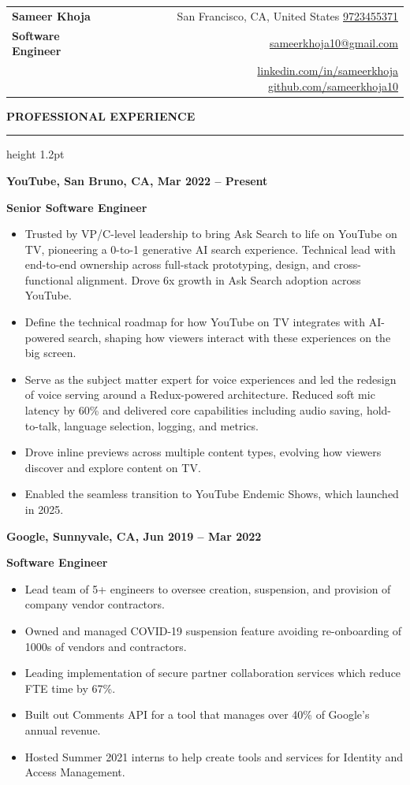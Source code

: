 \documentclass[11pt,a4paper]{article}
\newcommand{\sectionheading}[1]{%
  \vspace{1.25em}
  {\large\bfseries\MakeUppercase{#1}}\par
  \vspace{0.25em}
  \hrule height 1.2pt
  \vspace{0.95em}
}
\newcommand{\experience}[4]{%
  {\bfseries #1, #2, #3}\par
  {\bfseries #4}\par
  \vspace{0.35em}
}
\newenvironment{resumebullets}{%
  \begin{itemize}[
    leftmargin=1.55em,
    itemsep=0.18em,
    topsep=0pt,
    parsep=0pt,
    partopsep=0pt
  ]
}{%
  \end{itemize}
}
\begin{document}
\begin{tabularx}{\textwidth}{Xr}
  {\Huge\bfseries Sameer Khoja} &
  San Francisco, CA, United States \textbullet{}
  \href{tel:9723455371}{9723455371} \\
  {\LARGE\bfseries Software Engineer} &
  \href{mailto:sameerkhoja10@gmail.com}{sameerkhoja10@gmail.com} \\
  &
  \href{https://linkedin.com/in/sameerkhoja}{linkedin.com/in/sameerkhoja} \textbullet{}
  \href{https://github.com/sameerkhoja10}{github.com/sameerkhoja10}
\end{tabularx}

\sectionheading{Professional Experience}

\experience{YouTube}{San Bruno, CA}{Mar 2022 -- Present}{Senior Software Engineer}
\begin{resumebullets}
  \item Trusted by VP/C-level leadership to bring Ask Search to life on YouTube on TV, pioneering a 0-to-1 generative AI search experience. Technical lead with end-to-end ownership across full-stack prototyping, design, and cross-functional alignment. Drove 6x growth in Ask Search adoption across YouTube.
  \item Define the technical roadmap for how YouTube on TV integrates with AI-powered search, shaping how viewers interact with these experiences on the big screen.
  \item Serve as the subject matter expert for voice experiences and led the redesign of voice serving around a Redux-powered architecture. Reduced soft mic latency by 60\% and delivered core capabilities including audio saving, hold-to-talk, language selection, logging, and metrics.
  \item Drove inline previews across multiple content types, evolving how viewers discover and explore content on TV.
  \item Enabled the seamless transition to YouTube Endemic Shows, which launched in 2025.
\end{resumebullets}

\vspace{0.9em}
\experience{Google}{Sunnyvale, CA}{Jun 2019 -- Mar 2022}{Software Engineer}
\begin{resumebullets}
  \item Lead team of 5+ engineers to oversee creation, suspension, and provision of company vendor contractors.
  \item Owned and managed COVID-19 suspension feature avoiding re-onboarding of 1000s of vendors and contractors.
  \item Leading implementation of secure partner collaboration services which reduce FTE time by 67\%.
  \item Built out Comments API for a tool that manages over 40\% of Google's annual revenue.
  \item Hosted Summer 2021 interns to help create tools and services for Identity and Access Management.
\end{resumebullets}
\end{document}
